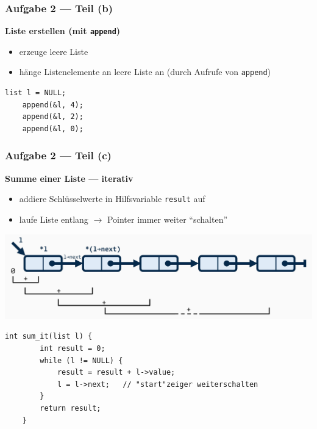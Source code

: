 \documentclass{beamer}
\newcommand*{\ttfamilywithbold}{\fontfamily{lmtt}\selectfont}
\begin{document}
\begin{frame}[fragile] \frametitle{Aufgabe 2 --- Teil (b)}
	\textbf{Liste erstellen (mit \texttt{append})}
	\begin{itemize}
		\item erzeuge leere Liste
		\item hänge Listenelemente an leere Liste an (durch Aufrufe von \texttt{append})
	\end{itemize}
	
	\pause
	
	\begin{lstlisting}[style=notebook]
	list l = NULL;
	append(&l, 4);
	append(&l, 2);
	append(&l, 0);
	\end{lstlisting}
\end{frame}

\begin{frame}[fragile] \frametitle{Aufgabe 2 --- Teil (c)}
	\textbf{Summe einer Liste --- iterativ}
	\begin{itemize} \small
		\item addiere Schlüsselwerte in Hilfsvariable \texttt{result} auf
		\item laufe Liste entlang  $\to$ Pointer immer weiter \enquote{schalten}
	\end{itemize}

	\pause

	\begin{center}
		\includegraphics[width=0.7\linewidth]{tut06-graphics/tut06-summe-it}
	\end{center}

	\pause
	
	\begin{lstlisting}[style=notebook, basicstyle=\scriptsize\ttfamilywithbold]
	int sum_it(list l) {
		int result = 0;
		while (l != NULL) {
			result = result + l->value;
			l = l->next;   // "start"zeiger weiterschalten 
		}
		return result;
	}
	\end{lstlisting}
\end{frame}
\end{document}
